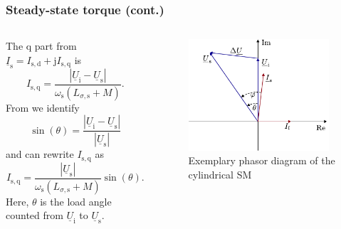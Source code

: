 \begin{frame}
	\frametitle{Steady-state torque (cont.)}
    \begin{columns}
		\begin{column}{0.55\textwidth}
		\onslide<+->
		The q part from $\underline{I}_\mathrm{s}=I_\mathrm{s,d} + \mathrm{j}I_\mathrm{s,q}$ is
		\begin{equation}
			I_\mathrm{s,q} = \frac{\left|\underline{U}_\mathrm{i} - \underline{U}_\mathrm{s}\right|}{\omega_\mathrm{s} \left(L_{\sigma,\mathrm{s}} + M\right)}.
		\end{equation}
		\onslide<+->
		From  we identify 
		$$\sin(\theta) = \frac{\left|\underline{U}_\mathrm{i} - \underline{U}_\mathrm{s}\right|}{\left|\underline{U}_\mathrm{s}\right|}$$
		\onslide<+->
		and can rewrite $I_\mathrm{s,q}$ as
		\begin{equation}
			I_\mathrm{s,q} = \frac{\left|\underline{U}_\mathrm{s}\right|}{\omega_\mathrm{s} \left(L_{\sigma,\mathrm{s}} + M\right)} \sin(\theta).
		\end{equation}
		\onslide<+->
		Here, $\theta$ is the load angle counted from $\underline{U}_\mathrm{i}$ to $\underline{U}_\mathrm{s}$.
        \end{column}
        \begin{column}{0.45\textwidth}
			\onslide<2->
            \begin{figure}
                \centering
                \includegraphics[width=0.95\textwidth]{fig/lec07/Load_angle_voltage_phasors.pdf}
                \caption{Exemplary phasor diagram of the cylindrical SM}
                \label{fig:Load_angle_voltage_phasors}
            \end{figure}
        \end{column}
    \end{columns}
\end{frame}

